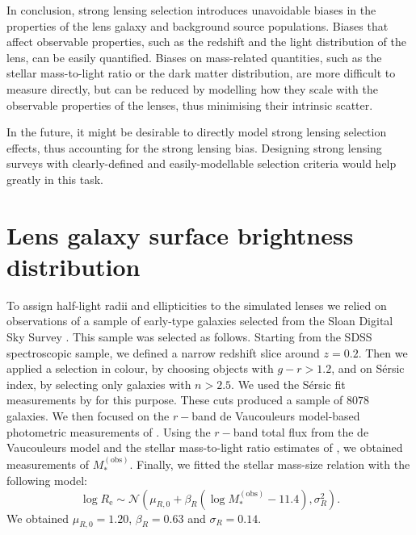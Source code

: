 \documentclass{aa}
\def\reff{R_{\mathrm{e}}}
\def\mobs{M_*^{(\mathrm{obs})}}
\begin{document}
In conclusion, strong lensing selection introduces unavoidable biases in the properties of the lens galaxy and background source populations.
Biases that affect observable properties, such as the redshift and the light distribution of the lens, can be easily quantified.
Biases on mass-related quantities, such as the stellar mass-to-light ratio or the dark matter distribution, are more difficult to measure directly, but can be reduced by modelling how they scale with the observable properties of the lenses, thus minimising their intrinsic scatter.

In the future, it might be desirable to directly model strong lensing selection effects, thus accounting for the strong lensing bias.
Designing strong lensing surveys with clearly-defined and easily-modellable selection criteria would help greatly in this task.








\appendix
\section{Lens galaxy surface brightness distribution}\label{sect:appendixa}

To assign half-light radii and ellipticities to the simulated lenses we relied on observations of a sample of early-type galaxies selected from the Sloan Digital Sky Survey \citep[SDSS][]{Yor++00}.
This sample was selected as follows. Starting from the SDSS spectroscopic sample, we defined a narrow redshift slice around $z=0.2$. Then we applied a selection in colour, by choosing objects with $g-r>1.2$, and on S\'{e}rsic index, by selecting only galaxies with $n>2.5$. We used the S\'{e}rsic fit measurements by \citet{Mee++15} for this purpose. These cuts produced a sample of $8078$ galaxies.
We then focused on the $r-$band de Vaucouleurs model-based photometric measurements of \citet{Mee++15}.
Using the $r-$band total flux from the de Vaucouleurs model and the stellar mass-to-light ratio estimates of \citet{Men++14}, we obtained measurements of $\mobs$. Finally, we fitted the stellar mass-size relation with the following model:
\begin{equation}
\log{\reff} \sim \mathcal{N}(\mu_{R,0} + \beta_R(\log{\mobs} - 11.4), \sigma_R^2).
\end{equation}
We obtained $\mu_{R,0}=1.20$, $\beta_R=0.63$ and $\sigma_R=0.14$.
\end{document}
